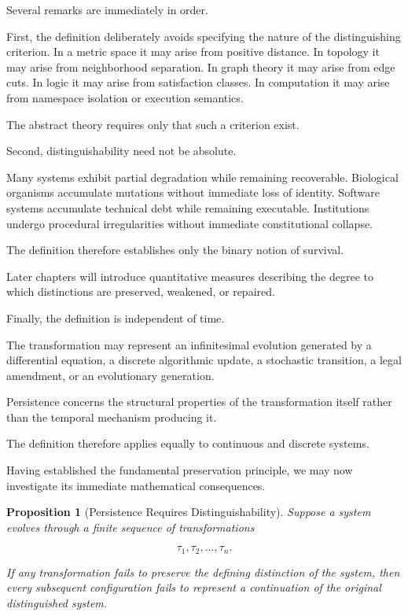 \documentclass[11pt]{book}
\numberwithin{equation}{chapter}
\theoremstyle{definition}
\theoremstyle{plain}
\newtheorem{proposition}[definition]{Proposition}
\begin{document}
Several remarks are immediately in order.

First, the definition deliberately avoids specifying the nature of the distinguishing criterion. In a metric space it may arise from positive distance. In topology it may arise from neighborhood separation. In graph theory it may arise from edge cuts. In logic it may arise from satisfaction classes. In computation it may arise from namespace isolation or execution semantics.

The abstract theory requires only that such a criterion exist.

Second, distinguishability need not be absolute.

Many systems exhibit partial degradation while remaining recoverable. Biological organisms accumulate mutations without immediate loss of identity. Software systems accumulate technical debt while remaining executable. Institutions undergo procedural irregularities without immediate constitutional collapse.

The definition therefore establishes only the binary notion of survival.

Later chapters will introduce quantitative measures describing the degree to which distinctions are preserved, weakened, or repaired.

Finally, the definition is independent of time.

The transformation may represent an infinitesimal evolution generated by a differential equation, a discrete algorithmic update, a stochastic transition, a legal amendment, or an evolutionary generation.

Persistence concerns the structural properties of the transformation itself rather than the temporal mechanism producing it.

The definition therefore applies equally to continuous and discrete systems.

Having established the fundamental preservation principle, we may now investigate its immediate mathematical consequences.

\begin{proposition}[Persistence Requires Distinguishability]
Suppose a system evolves through a finite sequence of transformations

\[
\tau_1,\tau_2,\ldots,\tau_n.
\]

If any transformation fails to preserve the defining distinction of the system, then every subsequent configuration fails to represent a continuation of the original distinguished system.
\end{proposition}
\end{document}
